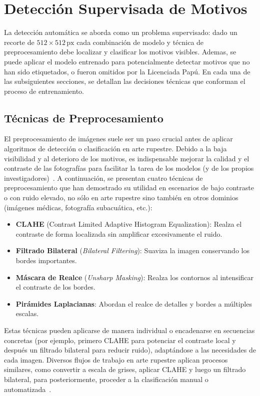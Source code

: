 \section{Detección Supervisada de Motivos}

La detección automática se aborda como un problema supervisado: dado un recorte de \(512\times512\,\text{px}\) cada combinación de modelo y técnica de preprocesamiento debe localizar y clasificar los motivos visibles.
Ademas, se puede aplicar el modelo entrenado para potencialmente detectar motivos que no han sido etiquetados, o fueron omitidos por la Licenciada Papú.
En cada una de las subsiguientes secciones, se detallan las decisiones técnicas que conforman el proceso de entrenamiento.

\subsection{Técnicas de Preprocesamiento}

El preprocesamiento de imágenes suele ser un paso crucial antes de aplicar algoritmos de detección o clasificación en arte rupestre.
Debido a la baja visibilidad y al deterioro de los motivos, es indispensable mejorar la calidad y el contraste de las fotografías para facilitar la tarea de los modelos (y de los propios investigadores)~\cite{li2022}.
A continuación, se presentan cuatro técnicas de preprocesamiento que han demostrado su utilidad en escenarios de bajo contraste o con ruido elevado, no sólo en arte rupestre sino también en otros dominios (imágenes médicas, fotografía subacuática, etc.):

\begin{itemize}
\item \textbf{CLAHE} (Contrast Limited Adaptive Histogram Equalization): Realza el contraste de forma localizada sin amplificar excesivamente el ruido.
\item \textbf{Filtrado Bilateral} (\textit{Bilateral Filtering}): Suaviza la imagen conservando los bordes importantes.
\item \textbf{Máscara de Realce} (\textit{Unsharp Masking}): Realza los contornos al intensificar el contraste de los bordes.
\item \textbf{Pirámides Laplacianas}: Abordan el realce de detalles y bordes a múltiples escalas.
\end{itemize}

Estas técnicas pueden aplicarse de manera individual o encadenarse en secuencias concretas (por ejemplo, primero CLAHE para potenciar el contraste local y después un filtrado bilateral para reducir ruido), adaptándose a las necesidades de cada imagen.
Diversos flujos de trabajo en arte rupestre aplican procesos similares, como convertir a escala de grises, aplicar CLAHE y luego un filtrado bilateral, para posteriormente, proceder a la clasificación manual o automatizada~\cite{xiao2020,li2022}.

